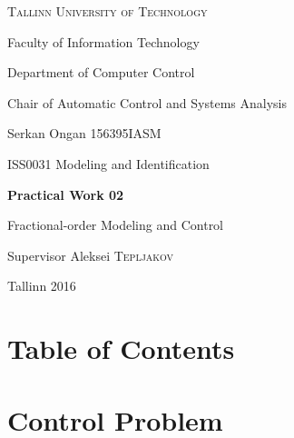 \documentclass[12pt,a4paper]{article}
\author{Serkan Ongan}
\begin{document}
\begin{titlepage}
	\centering
	{\scshape\Large Tallinn University of Technology \par}
	Faculty of Information Technology \par
	Department of Computer Control \par
	Chair of Automatic Control and Systems Analysis \par
	
	\vspace{4cm}
	
	Serkan Ongan 156395IASM \par
	{\large ISS0031 Modeling and Identification \par}
	{\Large\bfseries Practical Work 02\par}
	Fractional-order Modeling and Control \par
	
	\vspace{3cm}

	\begin{flushright}
	Supervisor  Aleksei \textsc{Tepljakov} \par
	\end{flushright}

	\vfill
	{Tallinn 2016 \par}
\end{titlepage}

\pagebreak

\section*{Table of Contents}

\tableofcontents

\pagebreak

\listoffigures

\pagebreak

\section{Control Problem}
\end{document}
